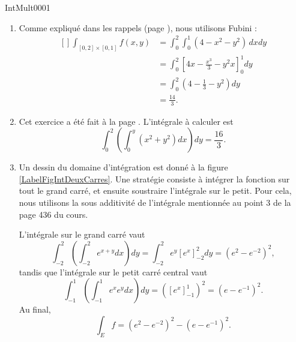 
\begin{corrige}{IntMult0001}

\begin{enumerate}

\item
Comme expliqué dans les rappels (page \pageref{PgRapIntMultFubiniRect}), nous utilisons Fubini :
\begin{equation}
	\begin{aligned}[]
	\int_{[0,2]\times[0,1]}f(x,y)&=\int_0^2\int_0^1(4-x^2-y^2)\,dxdy\\
			&=\int_0^2\left[ 4x-\frac{ x^3 }{ 3 }-y^2x \right]_0^1dy\\
			&=\int_0^2\left( 4-\frac{1}{ 3 }-y^2 \right)dy\\
			&=\frac{ 14 }{ 3 }.
	\end{aligned}
\end{equation}

\item
Cet exercice a été fait à la page \pageref{PgRapIntMultFubiniTri}. L'intégrale à calculer est
\begin{equation}
	\int_0^2\left( \int_0^y(x^2+y^2)dx \right)dy=\frac{ 16 }{ 3 }.
\end{equation}

\item
Un dessin du domaine d'intégration est donné à la figure \ref{LabelFigIntDeuxCarres}. Une stratégie consiste à intégrer la fonction sur tout le grand carré, et ensuite soustraire l'intégrale sur le petit. Pour cela, nous utilisons la sous additivité de l'intégrale mentionnée au point $3$ de la page 436 du cours.
\newcommand{\CaptionFigIntDeuxCarres}{Un domaine d'intégration.}

L'intégrale sur le grand carré vaut
\begin{equation}
		\int_{-2}^2\left( \int_{-2}^2 e^{x+y}dx \right)dy=\int_{-2}^2e^y[e^x]_{-2}^2dy=(e^2- e^{-2})^2,
\end{equation}
tandis que l'intégrale sur le petit carré central vaut
\begin{equation}
		\int_{-1}^1\left( \int_{-1}^1 e^xe^ydx \right)dy=\left( [e^x]_{-1}^1 \right)^2=\left( e-e^{-1} \right)^2.
\end{equation}
Au final,
\begin{equation}
	\int_Ef=(e^2-e^{-2})^2-(e-e^{-1})^2.
\end{equation}


\end{enumerate}
\end{corrige}

